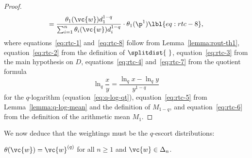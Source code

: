 \begin{proof}
\begin{align}
=
\frac{\theta_1(\vc{w}) d_1^{1 - q}}%
{\sum_{i = 1}^n \theta_i(\vc{w}) d_i^{1 - q}}
\cdot
\theta_1(\p^1)
\lbl{eq:rtc-8},
\end{align}
% 
where equations~\eqref{eq:rtc-1} and~\eqref{eq:rtc-8} follow from
Lemma~\ref{lemma:rout-th1}, equation~\eqref{eq:rtc-2} from the definition of
$\splitdist{\ }$, equation~\eqref{eq:rtc-3} from the main hypothesis on $D$,
equations~\eqref{eq:rtc-4} and~\eqref{eq:rtc-7} from the quotient formula
\[
\ln_q \frac{x}{y} 
=
\frac{\ln_q x - \ln_q y}{y^{1 - q}}
\]
for the $q$-logarithm (equation~\eqref{eq:q-log-qt}),
equation~\eqref{eq:rtc-5} from Lemma~\ref{lemma:q-log-mean} and the
definition of $M_{1 - q}$, and equation~\eqref{eq:rtc-6} from the
definition of the arithmetic mean $M_1$.
\end{proof}

We now deduce that the weightings must be the $q$-escort distributions:

\begin{lemma}
$\theta(\vc{w}) = \vc{w}^{(q)}$ for all $n \geq 1$ and $\vc{w} \in
  \Delta_n$. 
\end{lemma}

